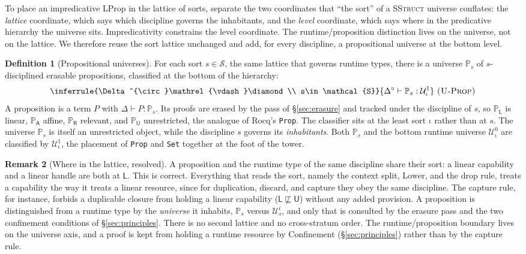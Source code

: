 \documentclass[11pt]{article}
\newcommand{\Srt}{\mathcal{S}}
\newcommand{\sle}{\sqsubseteq}
\newcommand{\Ty}[2]{\mathcal{U}^{#2}_{#1}}       %
\newcommand{\Prop}[1]{\mathbb{P}_{#1}}            %
\newcommand{\spv}[1]{#1^{\circ}}                  %
\newcommand{\wf}{\diamond}
\newcommand{\smdsh}{\mathrel{\vdash}}
\theoremstyle{definition}
\newtheorem{definition}{Definition}[section]
\newtheorem{remark}[definition]{Remark}
\theoremstyle{plain}
\begin{document}
To place an impredicative \textsf{LProp} in the lattice of sorts, separate the two
coordinates that ``the sort'' of a \textsc{SStruct} universe conflates: the
\emph{lattice} coordinate, which says which discipline governs the inhabitants,
and the \emph{level} coordinate, which says where in the predicative hierarchy the
universe sits. Impredicativity constrains the level coordinate. The
runtime/proposition distinction lives on the universe, not on the lattice. We
therefore reuse the sort lattice unchanged and add, for every discipline, a
propositional universe at the bottom level.

\begin{definition}[Propositional universes]\label{def:propuniv}
For each sort $s\in\Srt$, the same lattice that governs runtime types, there is a
universe $\Prop{s}$ of $s$-disciplined erasable propositions, classified at the
bottom of the hierarchy:
\[
  \inferrule{\spv{\Delta}\smdsh\wf \\ s\in\Srt}{\spv{\Delta}\smdsh \Prop{s} : \Ty{\iota}{1}}\ \textsc{(U-Prop)}
\]
A proposition is a term $P$ with $\Delta\smdsh P:\Prop{s}$. Its proofs are erased
by the pass of \S\ref{sec:erasure} and tracked under the discipline of $s$, so
$\Prop{\mathsf{L}}$ is linear, $\Prop{\mathsf{A}}$ affine, $\Prop{\mathsf{R}}$
relevant, and $\Prop{\mathsf{U}}$ unrestricted, the analogue of Rocq's
\texttt{Prop}. The classifier sits at the least sort $\iota$ rather than at $s$.
The universe $\Prop{s}$ is itself an unrestricted object, while the discipline $s$
governs its \emph{inhabitants}. Both $\Prop{s}$ and the bottom runtime universe
$\Ty{\iota}{0}$ are classified by $\Ty{\iota}{1}$, the placement of \texttt{Prop}
and \texttt{Set} together at the foot of the tower.
\end{definition}

\begin{remark}[Where in the lattice, resolved]\label{rem:wherelattice}
A proposition and the runtime type of the same discipline share their sort: a
linear capability and a linear handle are both at $\mathsf{L}$. This is correct.
Everything that reads the sort, namely the context split, $\mathrm{Lower}$, and
the drop rule, treats a capability the way it treats a linear resource, since for
duplication, discard, and capture they obey the same discipline. The capture rule,
for instance, forbids a duplicable closure from holding a linear capability
($\mathsf{L}\not\sle\mathsf{U}$) without any added provision. A proposition is
distinguished from a runtime type by the \emph{universe} it inhabits, $\Prop{s}$
versus $\Ty{s}{i}$, and only that is consulted by the erasure pass and the two
confinement conditions of \S\ref{sec:principles}. There is no second lattice and
no cross-stratum order. The runtime/proposition boundary lives on the universe
axis, and a proof is kept from holding a runtime resource by Confinement
(\S\ref{sec:principles}) rather than by the capture rule.
\end{remark}
\end{document}

